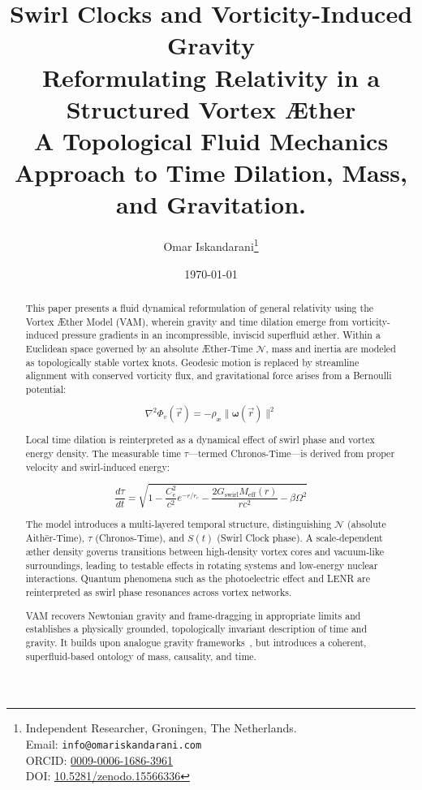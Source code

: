\documentclass[a4paper,12pt]{article}
\title{Swirl Clocks and Vorticity-Induced Gravity\\  Reformulating Relativity in a Structured Vortex Æther\\  A Topological Fluid Mechanics Approach to Time Dilation, Mass, and Gravitation. }
\author{
    Omar Iskandarani\thanks{
        Independent Researcher, Groningen, The Netherlands.\\
        Email: \texttt{info@omariskandarani.com}\\
        ORCID: \href{https://orcid.org/0009-0006-1686-3961}{0009-0006-1686-3961}\\
        DOI: \href{https://doi.org/10.5281/zenodo.15566336}{10.5281/zenodo.15566336}
    }
}
\date{\today}
\begin{document}
    \maketitle


    \begin{abstract}
        This paper presents a fluid dynamical reformulation of general relativity using the Vortex Æther Model (VAM), wherein gravity and time dilation emerge from vorticity-induced pressure gradients in an incompressible, inviscid superfluid æther. Within a Euclidean space governed by an absolute Æther-Time $\mathcal{N}$, mass and inertia are modeled as topologically stable vortex knots. Geodesic motion is replaced by streamline alignment with conserved vorticity flux, and gravitational force arises from a Bernoulli potential:

        \begin{equation*}
            \nabla^2 \Phi_v(\vec{r}) = -\rho_\text{\ae} \|\boldsymbol{\omega}(\vec{r})\|^2
        \end{equation*}

        Local time dilation is reinterpreted as a dynamical effect of swirl phase and vortex energy density. The measurable time $\tau$—termed Chronos-Time—is derived from proper velocity and swirl-induced energy:

        \begin{equation*}
            \frac{d\tau}{dt} = \sqrt{1 - \frac{C_e^2}{c^2} e^{-r/r_c} - \frac{2G_\text{swirl} M_\text{eff}(r)}{rc^2} - \beta \Omega^2}
        \end{equation*}

        The model introduces a multi-layered temporal structure, distinguishing $\mathcal{N}$ (absolute Aithēr-Time), $\tau$ (Chronos-Time), and $S(t)$ (Swirl Clock phase). A scale-dependent æther density governs transitions between high-density vortex cores and vacuum-like surroundings, leading to testable effects in rotating systems and low-energy nuclear interactions. Quantum phenomena such as the photoelectric effect and LENR are reinterpreted as swirl phase resonances across vortex networks.

        VAM recovers Newtonian gravity and frame-dragging in appropriate limits and establishes a physically grounded, topologically invariant description of time and gravity. It builds upon analogue gravity frameworks~\cite{barcelo2011analogue,volovik2009universe}, but introduces a coherent, superfluid-based ontology of mass, causality, and time.
    \end{abstract}
\end{document}
